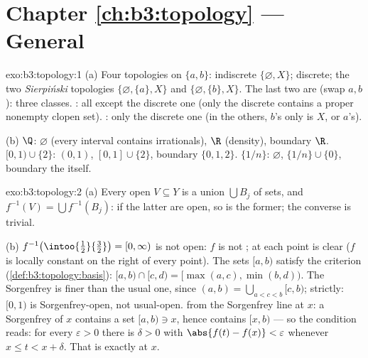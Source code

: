 \section*{Chapter \ref{ch:b3:topology} --- General }

\begin{solution}{exo:b3:topology:1}
(a) Four topologies on $\{a,b\}$: indiscrete
$\{\varnothing, X\}$; discrete; the two \emph{Sierpi\'nski}
topologies $\{\varnothing, \{a\}, X\}$ and $\{\varnothing,
\{b\}, X\}$. The last two are  (swap $a, b$): three
classes. : all except the discrete one (only the
discrete  contains a proper nonempty clopen set).
: only the discrete one (in the others, $b$'s only
 is $X$, or $a$'s).

(b) $\Q$:  $\varnothing$ (every interval contains
irrationals),  $\R$ (density), boundary $\R$. $[0,1)
\cup \{2\}$:  $(0,1)$,  $[0,1]\cup\{2\}$,
boundary $\{0, 1, 2\}$. $\{1/n\}$:  $\varnothing$,
 $\{1/n\}\cup\{0\}$, boundary the  itself.
\end{solution}

\begin{solution}{exo:b3:topology:2}
(a) Every open $V \subseteq Y$ is a union $\bigcup B_j$ of 
sets, and $f^{-1}(V) = \bigcup f^{-1}(B_j)$: if the latter are
open, so is the former; the converse is trivial.

(b) $f^{-1}\bigl(\intoo{\frac12}{\frac32}\bigr) = [0, \infty)$
is not open: $f$ is not ;  at each
point is clear ($f$ is locally constant on the right of every
point). The sets $[a, b)$ satisfy the  criterion
(\cref{def:b3:topology:basis}): $[a,b)\cap[c,d) = [\max(a,c),
\min(b,d))$. The Sorgenfrey  is finer than the usual
one, since $(a, b) = \bigcup_{a < c < b}[c, b)$; strictly:
$[0,1)$ is Sorgenfrey-open, not usual-open.  from the
Sorgenfrey line at $x$: a Sorgenfrey  of $x$
contains a  set $[a, b) \ni x$, hence contains $[x, b)$ ---
so the  condition reads: for every $\varepsilon > 0$
there is $\delta > 0$ with $\abs{f(t) - f(x)} < \varepsilon$
whenever $x \leq t < x + \delta$. That is exactly
 at $x$.
\end{solution}

